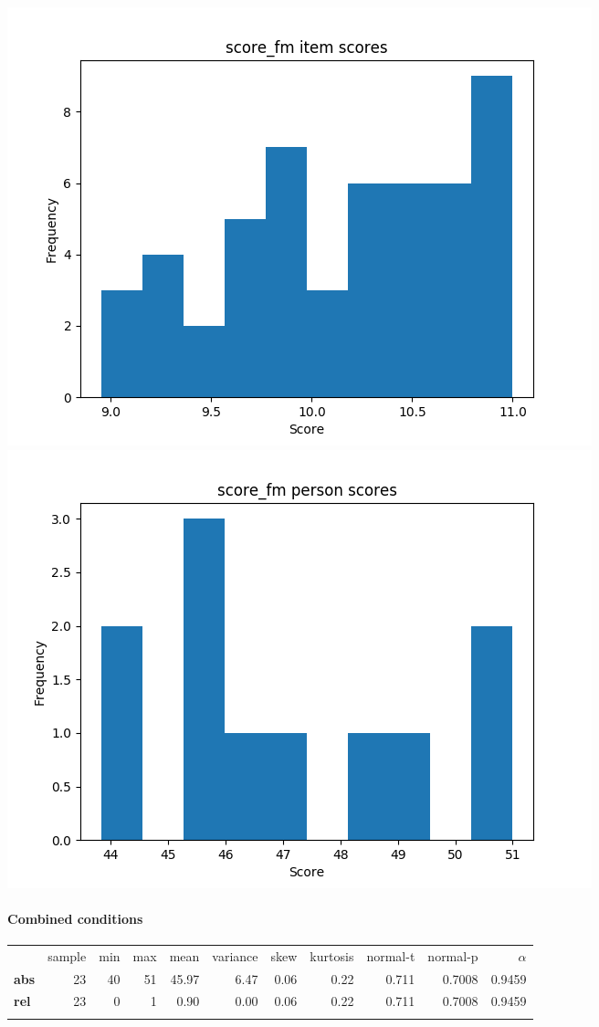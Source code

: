 \documentclass[]{article}
\begin{document}
\includegraphics{score_fm_diff.png} \includegraphics{score_fm_abil.png}

\FloatBarrier
\paragraph{Combined conditions}\label{combined-conditions-1}

\begin{longtable}[c]{@{}lrrrrrrrrrr@{}}
\toprule\addlinespace
& sample & min & max & mean & variance & skew & kurtosis & normal-t &
normal-p & $\alpha$
\\\addlinespace
\midrule\endhead
\textbf{abs} & 23 & 40 & 51 & 45.97 & 6.47 & 0.06 & 0.22 & 0.711 &
0.7008 & 0.9459
\\\addlinespace
\textbf{rel} & 23 & 0 & 1 & 0.90 & 0.00 & 0.06 & 0.22 & 0.711 & 0.7008 &
0.9459
\\\addlinespace
\bottomrule
\end{longtable}
\end{document}
